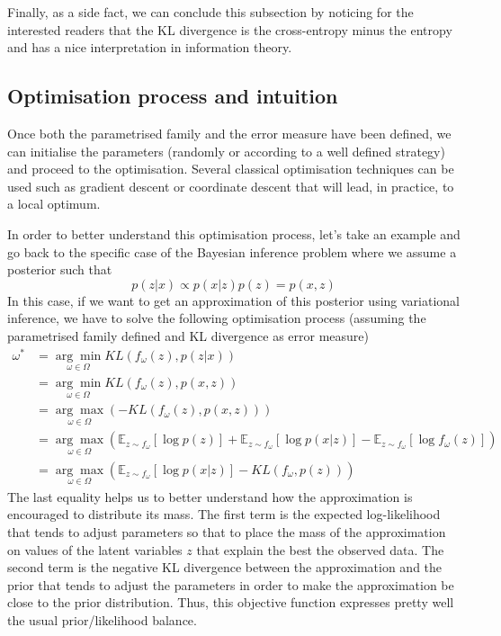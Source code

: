 Finally, as a side fact, we can conclude this subsection by noticing for the interested readers that the KL divergence is the cross-entropy minus the entropy and has a nice interpretation in information theory.

\subsection{Optimisation process and intuition}

Once both the parametrised family and the error measure have been defined, we can initialise the parameters (randomly or according to a well defined strategy) and proceed to the optimisation. Several classical optimisation techniques can be used such as gradient descent or coordinate descent that will lead, in practice, to a local optimum.

In order to better understand this optimisation process, let's take an example and go back to the specific case of the Bayesian inference problem where we assume a posterior such that
\begin{equation}p(z | x) \propto p(x | z) p(z)=p(x, z)\end{equation}
In this case, if we want to get an approximation of this posterior using variational inference, we have to solve the following optimisation process (assuming the parametrised family defined and KL divergence as error measure)
\begin{equation}\begin{aligned}
\omega^{*} &=\underset{\omega \in \Omega}{\arg \min } K L\left(f_{\omega}(z), p(z | x)\right) \\
&=\underset{\omega \in \Omega}{\arg \min } K L\left(f_{\omega}(z), p(x, z)\right) \\
&=\underset{\omega \in \Omega}{\arg \max }\left(-K L\left(f_{\omega}(z), p(x, z)\right)\right) \\
&=\underset{\omega \in \Omega}{\arg \max }\left(\mathbb{E}_{z \sim f_{\omega}}[\log p(z)]+\mathbb{E}_{z \sim f_{\omega}}[\log p(x | z)]-\mathbb{E}_{z \sim f_{\omega}}\left[\log f_{\omega}(z)\right]\right) \\
&=\underset{\omega \in \Omega}{\arg \max }\left(\mathbb{E}_{z \sim f_{\omega}}[\log p(x | z)]-K L\left(f_{\omega}, p(z)\right)\right)
\end{aligned}\end{equation}
The last equality helps us to better understand how the approximation is encouraged to distribute its mass. The first term is the expected log-likelihood that tends to adjust parameters so that to place the mass of the approximation on values of the latent variables $z$ that explain the best the observed data. The second term is the negative KL divergence between the approximation and the prior that tends to adjust the parameters in order to make the approximation be close to the prior distribution. Thus, this objective function expresses pretty well the usual prior/likelihood balance.

